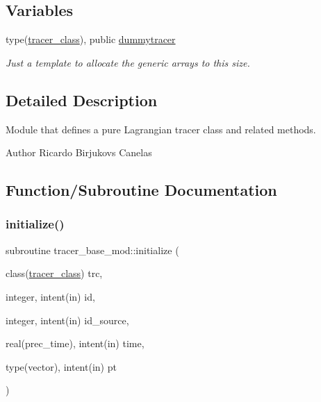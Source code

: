 \subsection*{Variables}
\begin{DoxyCompactItemize}
\item 
type(\mbox{\hyperlink{structtracer__base__mod_1_1tracer__class}{tracer\+\_\+class}}), public \mbox{\hyperlink{namespacetracer__base__mod_a6e04d44b4ef46cf27fb0e38290a98c14}{dummytracer}}
\begin{DoxyCompactList}\small\item\em Just a template to allocate the generic arrays to this size. \end{DoxyCompactList}\end{DoxyCompactItemize}


\subsection{Detailed Description}
Module that defines a pure Lagrangian tracer class and related methods. 

\begin{DoxyAuthor}{Author}
Ricardo Birjukovs Canelas 
\end{DoxyAuthor}


\subsection{Function/\+Subroutine Documentation}
\mbox{\label{namespacetracer__base__mod_ae73e3d1fd8818cf3e1a8593aafebea43}} 
\subsubsection{\texorpdfstring{initialize()}{initialize()}}
{\footnotesize\ttfamily subroutine tracer\+\_\+base\+\_\+mod\+::initialize (\begin{DoxyParamCaption}\item[{class(\mbox{\hyperlink{structtracer__base__mod_1_1tracer__class}{tracer\+\_\+class}})}]{trc,  }\item[{integer, intent(in)}]{id,  }\item[{integer, intent(in)}]{id\+\_\+source,  }\item[{real(prec\+\_\+time), intent(in)}]{time,  }\item[{type(vector), intent(in)}]{pt }\end{DoxyParamCaption})\hspace{0.3cm}{\ttfamily [private]}}



